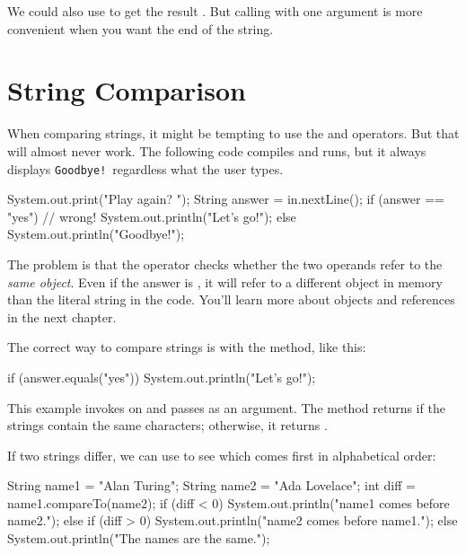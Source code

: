 We could also use  to get the result .
But calling  with one argument is more convenient when you want the end of the string.


\section{String Comparison}
\label{loops-strings_string-comparison}
\label{strcmp}


When comparing strings, it might be tempting to use the \java{==} and \java{!=} operators.
But that will almost never work.
The following code compiles and runs, but it always displays {\tt Goodbye!}\ regardless what the user types.

\begin{code}
System.out.print("Play again? ");
String answer = in.nextLine();
if (answer == "yes") {                 // wrong!
    System.out.println("Let's go!");
} else {
    System.out.println("Goodbye!");
}
\end{code}

The problem is that the \java{==} operator checks whether the two operands refer to the {\em same object}.
Even if the answer is , it will refer to a different object in memory than the literal string  in the code.
You'll learn more about objects and references in the next chapter.

The correct way to compare strings is with the  method, like this:

\begin{code}
if (answer.equals("yes")) {
    System.out.println("Let's go!");
}
\end{code}

This example invokes  on  and passes  as an argument.
The  method returns  if the strings contain the same characters; otherwise, it returns .


If two strings differ, we can use  to see which comes first in alphabetical order:

\begin{code}
String name1 = "Alan Turing";
String name2 = "Ada Lovelace";
int diff = name1.compareTo(name2);
if (diff < 0) {
    System.out.println("name1 comes before name2.");
} else if (diff > 0) {
    System.out.println("name2 comes before name1.");
} else {
    System.out.println("The names are the same.");
}
\end{code}

